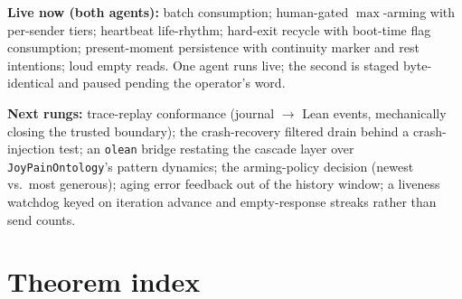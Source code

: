 \documentclass[11pt]{article}
\newcommand{\lean}[1]{\texttt{#1}}
\newcommand{\code}[1]{\texttt{#1}}
\begin{document}
\textbf{Live now (both agents):} batch consumption; human-gated
$\max$-arming with per-sender tiers; heartbeat life-rhythm; hard-exit
recycle with boot-time flag consumption; present-moment persistence with
continuity marker and rest intentions; loud empty reads. One agent runs
live; the second is staged byte-identical and paused pending the
operator's word.

\textbf{Next rungs:} trace-replay conformance (journal $\to$ Lean
events, mechanically closing the trusted boundary); the crash-recovery
filtered drain behind a crash-injection test; an \code{olean} bridge
restating the cascade layer over \lean{JoyPainOntology}'s pattern
dynamics; the arming-policy decision (newest vs.\ most generous);
aging error feedback out of the history window; a liveness watchdog
keyed on iteration advance and empty-response streaks rather than send
counts.

\appendix
\section{Theorem index}
\end{document}
